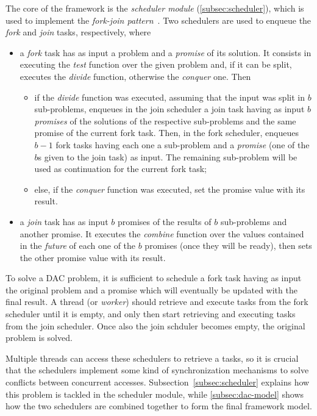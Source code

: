 \documentclass[11pt, a4paper]{article}
\begin{document}
The core of the framework is the \emph{scheduler module} (\autoref{subsec:scheduler}), which is used to implement the \emph{fork-join pattern}~\cite{mccool2012structured}. Two schedulers are used to enqueue the \emph{fork} and \emph{join} tasks, respectively, where
%
\begin{itemize}
	\item a \emph{fork} task has as input a problem and a \emph{promise} of its solution. It consists in executing the \emph{test} function over the given problem and, if it can be split, executes the \emph{divide} function, otherwise the \emph{conquer} one. Then
	\begin{itemize}
		\item if the \emph{divide} function was executed, assuming that the input was split in $b$ sub-problems, enqueues in the join scheduler a join task having as input $b$ \emph{promises} of the solutions of the respective sub-problems and the same promise of the current fork task. Then, in the fork scheduler, enqueues  $b-1$ fork tasks having each one a sub-problem and a \emph{promise} (one of the $b$s given to the join task) as input. The remaining sub-problem will be used as continuation for the current fork task;
		\item else, if the \emph{conquer} function was executed, set the promise value with its result.
	\end{itemize}

	\item a \emph{join} task has as input $b$ promises of the results of $b$ sub-problems and another promise. It executes the \emph{combine} function over the values contained in the \emph{future} of each one of the $b$ promises (once they will be ready), then sets the other promise value with its result.
\end{itemize}

To solve a DAC problem, it is sufficient to schedule a fork task having as input the original problem and a promise which will eventually be updated with the final result. A thread (or \emph{worker}) should retrieve and execute tasks from the fork scheduler until it is empty, and only then start retrieving and executing tasks from the join scheduler. Once also the join schduler becomes empty, the original problem is solved. 

Multiple threads can access these schedulers to retrieve a tasks, so it is crucial that the schedulers implement some kind of synchronization mechanisms to solve conflicts between concurrent accesses. Subsection~\ref{subsec:scheduler} explains how this problem is tackled in the scheduler module, while \autoref{subsec:dac-model} shows how the two schedulers are combined together to form the final framework model.
\end{document}
